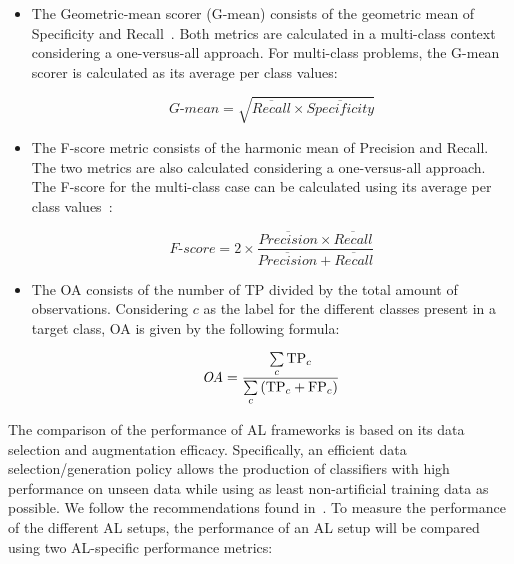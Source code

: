 \begin{itemize}
    \item The Geometric-mean scorer (G-mean) consists of the geometric mean of
        Specificity and Recall~\cite{Kubat1997}. Both metrics are calculated
        in a multi-class context considering a one-versus-all approach. For
        multi-class problems, the G-mean scorer is calculated as its average
        per class values: 
        
        \begin{equation*}
            \textit{G-mean} = \sqrt{\overline{Recall} \times
            \overline{Specificity}}
        \end{equation*}

    \item The F-score metric consists of the harmonic mean of Precision and
        Recall. The two metrics are also calculated considering a
        one-versus-all approach. The F-score for the multi-class case can be
        calculated using its average per class values~\cite{Jeni2013}:

        \begin{equation*}
            \textit{F-score}=2\times\frac{\overline{Precision} \times
            \overline{Recall}}{\overline{Precision} + \overline{Recall}}
        \end{equation*}

    \item The OA consists of the number of TP divided by the total amount of
        observations. Considering $c$ as the label for the different classes
        present in a target class, OA is given by the following formula:

        \begin{equation*}
            \textit{OA} = \frac{\sum\limits_{c}{\text{TP}_{c}}}{%
		    	      \sum\limits_{c}{(\text{TP}_{c}+\text{FP}_{c})}}
        \end{equation*}
\end{itemize}

The comparison of the performance of AL frameworks is based on its data
selection and augmentation efficacy. Specifically, an efficient data
selection/generation policy allows the production of classifiers with high
performance on unseen data while using as least non-artificial training data
as possible. We follow the recommendations found in~\cite{Kottke2017}. To
measure the performance of the different AL setups, the performance of an AL
setup will be compared using two AL-specific performance metrics:

